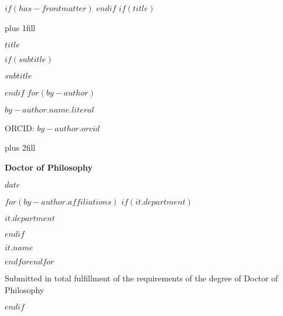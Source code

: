 $if(has-frontmatter)$
\frontmatter
$endif$
$if(title)$
\cleardoublepage
\thispagestyle{empty}
{\centering
\hbox{}\vskip 0cm plus 1fill
{\Huge\bfseries $title$ \par}
$if(subtitle)$
\vspace{3ex}
{\Large\bfseries $subtitle$ \par}
$endif$
\vspace{12ex}
$for(by-author)$
{\Large\bfseries $by-author.name.literal$ \par}
\vspace{3ex}
{\Large ORCID: $by-author.orcid$ \par}
\vskip 0cm plus 2fill
{\bfseries\large Doctor of Philosophy \par}
\vspace{3ex}
{\bfseries\large $date$ \par}
\vspace{12ex}
$for(by-author.affiliations)$%
$if(it.department)$%
{\bfseries\large $it.department$ \par}
\vspace{3ex}
$endif$%
{\bfseries\large $it.name$ \par}
$endfor$$endfor$%
\vspace{12ex}
{\small Submitted in total fulfillment of the requirements
of the degree of Doctor of Philosophy \par}
}
$endif$